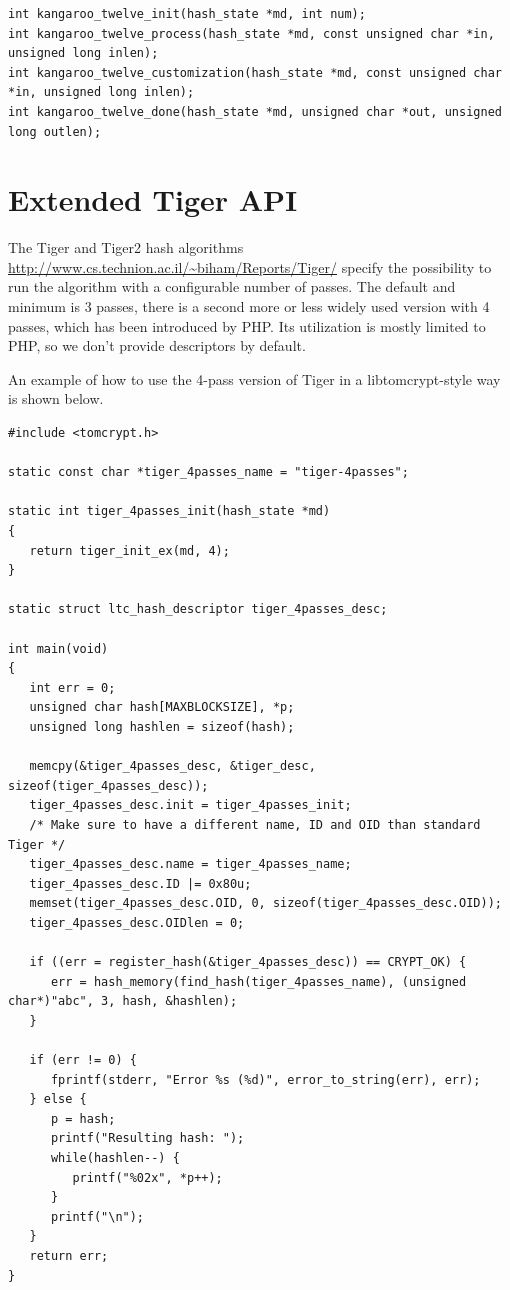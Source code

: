 \documentclass[synpaper]{book}
\newcommand{\mysection}[1]    %
	{                   %
	\section{#1}
   \markboth{\textsf{www.libtom.net}}{\thesection ~ {#1}}
	}
\begin{document}
\begin{small}
\begin{verbatim}
int kangaroo_twelve_init(hash_state *md, int num);
int kangaroo_twelve_process(hash_state *md, const unsigned char *in, unsigned long inlen);
int kangaroo_twelve_customization(hash_state *md, const unsigned char *in, unsigned long inlen);
int kangaroo_twelve_done(hash_state *md, unsigned char *out, unsigned long outlen);
\end{verbatim}
\end{small}


\mysection{Extended Tiger API}

The Tiger and Tiger2 hash algorithms \url{http://www.cs.technion.ac.il/~biham/Reports/Tiger/} specify the possibility to run the algorithm with
a configurable number of passes.  The default and minimum is 3 passes, there is a second more or less widely used version with 4 passes,
which has been introduced by PHP.  Its utilization is mostly limited to PHP, so we don't provide descriptors by default.

An example of how to use the 4-pass version of Tiger in a libtomcrypt-style way is shown below.

\begin{small}
\begin{verbatim}
#include <tomcrypt.h>

static const char *tiger_4passes_name = "tiger-4passes";

static int tiger_4passes_init(hash_state *md)
{
   return tiger_init_ex(md, 4);
}

static struct ltc_hash_descriptor tiger_4passes_desc;

int main(void)
{
   int err = 0;
   unsigned char hash[MAXBLOCKSIZE], *p;
   unsigned long hashlen = sizeof(hash);

   memcpy(&tiger_4passes_desc, &tiger_desc, sizeof(tiger_4passes_desc));
   tiger_4passes_desc.init = tiger_4passes_init;
   /* Make sure to have a different name, ID and OID than standard Tiger */
   tiger_4passes_desc.name = tiger_4passes_name;
   tiger_4passes_desc.ID |= 0x80u;
   memset(tiger_4passes_desc.OID, 0, sizeof(tiger_4passes_desc.OID));
   tiger_4passes_desc.OIDlen = 0;

   if ((err = register_hash(&tiger_4passes_desc)) == CRYPT_OK) {
      err = hash_memory(find_hash(tiger_4passes_name), (unsigned char*)"abc", 3, hash, &hashlen);
   }

   if (err != 0) {
      fprintf(stderr, "Error %s (%d)", error_to_string(err), err);
   } else {
      p = hash;
      printf("Resulting hash: ");
      while(hashlen--) {
         printf("%02x", *p++);
      }
      printf("\n");
   }
   return err;
}
\end{verbatim}
\end{small}
\end{document}
